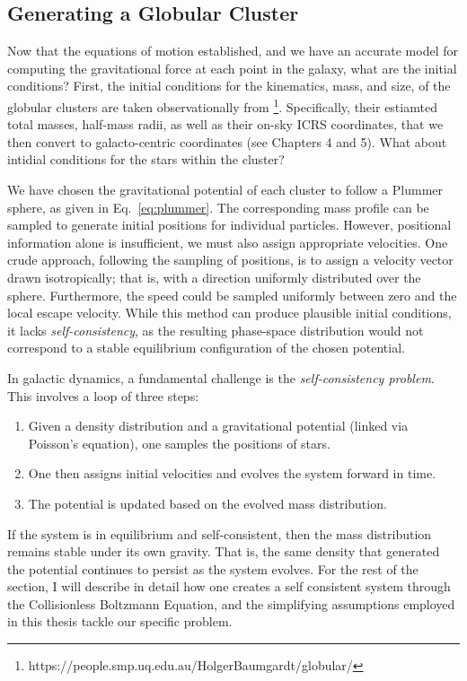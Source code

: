     \subsection{Generating a Globular Cluster}\label{subsec:initialconditions}
        Now that the equations of motion established, and we have an accurate model for computing the gravitational force at each point in the galaxy, what are the initial conditions? First, the initial conditions for the kinematics, mass, and size, of the globular clusters are taken observationally from \citet{2018MNRAS.478.1520B} \citep[this catalog was assembled across a series of works, see also][]{2017MNRAS.464.2174B,2019MNRAS.482.5138B,2020PASA...37...46B,2021MNRAS.505.5957B}\footnote{https://people.smp.uq.edu.au/HolgerBaumgardt/globular/}. Specifically, their estiamted total masses, half-mass radii, as well as their on-sky ICRS coordinates, that we then convert to galacto-centric coordinates (see Chapters 4 and 5). What about intidial conditions for the stars within the cluster? 

        We have chosen the gravitational potential of each cluster to follow a Plummer sphere, as given in Eq.~\ref{eq:plummer}. The corresponding mass profile can be sampled to generate initial positions for individual particles. However, positional information alone is insufficient, we must also assign appropriate velocities. One crude approach, following the sampling of positions, is to assign a velocity vector drawn isotropically; that is, with a direction uniformly distributed over the sphere. Furthermore, the speed could be sampled uniformly between zero and the local escape velocity. While this method can produce plausible initial conditions, it lacks \textit{self-consistency}, as the resulting phase-space distribution would not correspond to a stable equilibrium configuration of the chosen potential.

        In galactic dynamics, a fundamental challenge is the \textit{self-consistency problem}. This involves a loop of three steps:  
        \begin{enumerate}
            \item Given a density distribution and a gravitational potential (linked via Poisson's equation), one samples the positions of stars.  
            \item One then assigns initial velocities and evolves the system forward in time.  
            \item The potential is updated based on the evolved mass distribution.
        \end{enumerate}
        If the system is in equilibrium and self-consistent, then the mass distribution remains stable under its own gravity. That is, the same density that generated the potential continues to persist as the system evolves. For the rest of the section, I will describe in detail how one creates a self consistent system through the Collisionless Boltzmann Equation, and the simplifying assumptions employed in this thesis tackle our specific problem.

